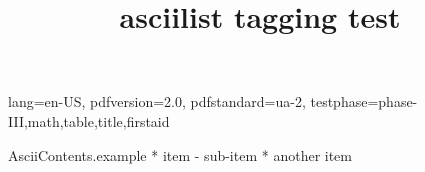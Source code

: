 \DocumentMetadata
  {
    lang=en-US,
    pdfversion=2.0,
    pdfstandard=ua-2,
    testphase={phase-III,math,table,title,firstaid}
  }
\begin{filecontents*}[overwrite]{AsciiContents.example}
 * item
   - sub-item
 * another item
\end{filecontents*}

\documentclass{article}
\usepackage{asciilist}

\title{asciilist tagging test}



\begin{enumerate}
\item bla
\item blub
\end{enumerate}


